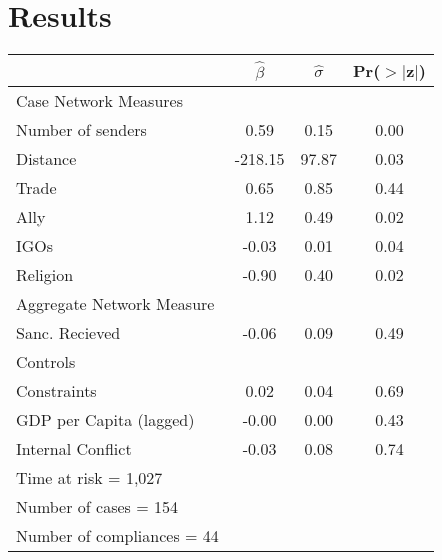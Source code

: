 \section{Results}
\label{Results} 
\begin{table}[ht]
		\begin{center}
		\begin{tabular}{lccc}
		  \hline\hline
		 &$\hat{\beta}$&$\hat{\sigma}$& Pr($>$$|$z$|$) \\ 
		  \hline
		  Case Network Measures \\
		  \;\;\;   Number of senders & 0.59 & 0.15 & 0.00 \\ 
		  \;\;\;   Distance & -218.15 & 97.87 & 0.03 \\
		  \;\;\;   Trade & 0.65 & 0.85 & 0.44 \\ 
		  \;\;\;   Ally & 1.12 & 0.49 & 0.02 \\ 
		  \;\;\;   IGOs & -0.03 & 0.01 & 0.04 \\ 
		  \;\;\;   Religion & -0.90 & 0.40 & 0.02 \\ 
		  Aggregate Network Measure \\
		  \;\;\;   Sanc. Recieved & -0.06 & 0.09 & 0.49 \\ 
		  Controls \\
		  \;\;\;   Constraints & 0.02 & 0.04 & 0.69 \\ 		  
		  \;\;\;   GDP per Capita (lagged) & -0.00 & 0.00 & 0.43 \\ 
		  \;\;\;   Internal Conflict & -0.03 & 0.08 & 0.74 \\ 
		   \hline
		   Time at risk = 1,027 &&&\\
			 Number of cases = 154 &&&\\
		   Number of compliances = 44 &&&\\
		  \hline\hline
		\end{tabular}
		\end{center}
\end{table}


